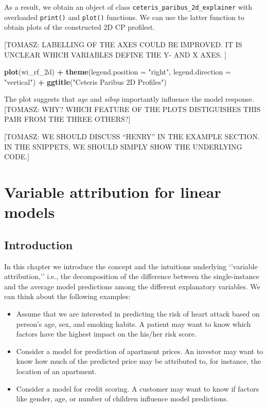 \documentclass[12pt,]{krantz}
\newenvironment{Shaded}{\begin{snugshade}}{\end{snugshade}}
\newcommand{\DataTypeTok}[1]{\textcolor[rgb]{0.13,0.29,0.53}{#1}}
\newcommand{\KeywordTok}[1]{\textcolor[rgb]{0.13,0.29,0.53}{\textbf{#1}}}
\newcommand{\NormalTok}[1]{#1}
\newcommand{\OperatorTok}[1]{\textcolor[rgb]{0.81,0.36,0.00}{\textbf{#1}}}
\newcommand{\StringTok}[1]{\textcolor[rgb]{0.31,0.60,0.02}{#1}}
\providecommand{\tightlist}{%
  \setlength{\itemsep}{0pt}\setlength{\parskip}{0pt}}
\theoremstyle{definition}
\theoremstyle{definition}
\theoremstyle{definition}
\theoremstyle{remark}
\begin{document}
As a result, we obtain an object of class
\texttt{ceteris\_paribus\_2d\_explainer} with overloaded
\texttt{print()} and \texttt{plot()} functions. We can use the latter
function to obtain plots of the constructed 2D CP profilest.

{[}TOMASZ: LABELLING OF THE AXES COULD BE IMPROVED. IT IS UNCLEAR WHICH
VARIABLES DEFINE THE Y- AND X AXES. {]}

\begin{Shaded}
\begin{Highlighting}[]
\KeywordTok{plot}\NormalTok{(wi_rf_2d) }\OperatorTok{+}\StringTok{ }
\StringTok{  }\KeywordTok{theme}\NormalTok{(}\DataTypeTok{legend.position =} \StringTok{"right"}\NormalTok{, }\DataTypeTok{legend.direction =} \StringTok{"vertical"}\NormalTok{) }\OperatorTok{+}\StringTok{ }\KeywordTok{ggtitle}\NormalTok{(}\StringTok{"Ceteris Paribus 2D Profiles"}\NormalTok{)}
\end{Highlighting}
\end{Shaded}

The plot suggests that \emph{age} and \emph{sibsp} importantly influence
the model response. {[}TOMASZ: WHY? WHICH FEATURE OF THE PLOTS
DISTIGUISHES THIS PAIR FROM THE THREE OTHERS?{]}

{[}TOMASZ: WE SHOULD DISCUSS ``HENRY'' IN THE EXAMPLE SECTION. IN THE
SNIPPETS, WE SHOULD SIMPLY SHOW THE UNDERLYING CODE.{]}

\hypertarget{variableAttributionMethods}{%
\section{Variable attribution for linear
models}\label{variableAttributionMethods}}

\hypertarget{introduction-3}{%
\subsection{Introduction}\label{introduction-3}}

In this chapter we introduce the concept and the intuitions underlying
`'variable attribution,'' i.e., the decomposition of the difference
between the single-instance and the average model predictions among the
different explanatory variables. We can think about the following
examples:

\begin{itemize}
\tightlist
\item
  Assume that we are interested in predicting the risk of heart attack
  based on person's age, sex, and smoking habits. A patient may want to
  know which factors have the highest impact on the his/her risk score.
\item
  Consider a model for prediction of apartment prices. An investor may
  want to know how much of the predicted price may be attributed to, for
  instance, the location of an apartment.
\item
  Consider a model for credit scoring. A customer may want to know if
  factors like gender, age, or number of children influence model
  predictions.
\end{itemize}
\end{document}
